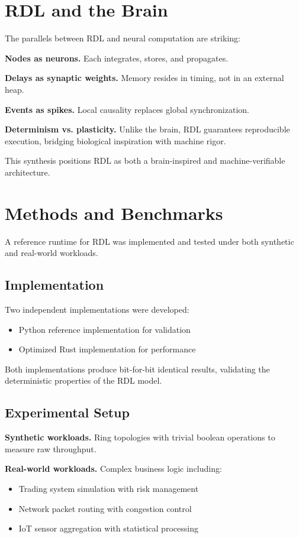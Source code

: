 \documentclass[conference]{IEEEtran}
\begin{document}
\section{RDL and the Brain}

The parallels between RDL and neural computation are striking:

\textbf{Nodes as neurons.} Each integrates, stores, and propagates.

\textbf{Delays as synaptic weights.} Memory resides in timing, not in an external heap.

\textbf{Events as spikes.} Local causality replaces global synchronization.

\textbf{Determinism vs. plasticity.} Unlike the brain, RDL guarantees reproducible execution, bridging biological inspiration with machine rigor.

This synthesis positions RDL as both a brain-inspired and machine-verifiable architecture.

\section{Methods and Benchmarks}

A reference runtime for RDL was implemented and tested under both synthetic and real-world workloads.

\subsection{Implementation}

Two independent implementations were developed:
\begin{itemize}
\item Python reference implementation for validation
\item Optimized Rust implementation for performance
\end{itemize}

Both implementations produce bit-for-bit identical results, validating the deterministic properties of the RDL model.

\subsection{Experimental Setup}

\textbf{Synthetic workloads.} Ring topologies with trivial boolean operations to measure raw throughput.

\textbf{Real-world workloads.} Complex business logic including:
\begin{itemize}
\item Trading system simulation with risk management
\item Network packet routing with congestion control  
\item IoT sensor aggregation with statistical processing
\end{itemize}
\end{document}
